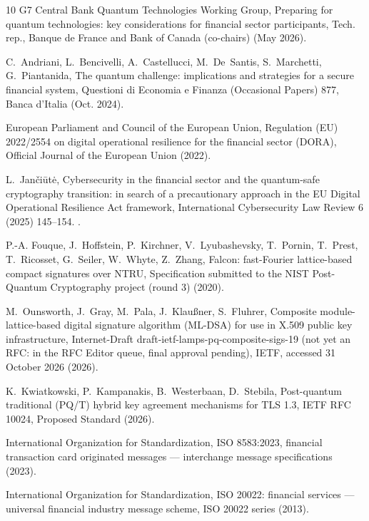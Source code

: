 \documentclass[preprint,12pt]{elsarticle}
\begin{document}
\begin{thebibliography}{10}
{G7 Central Bank Quantum Technologies Working Group}, Preparing for quantum
  technologies: key considerations for financial sector participants, Tech.
  rep., Banque de France and Bank of Canada (co-chairs) (May 2026).

C.~Andriani, L.~Bencivelli, A.~Castellucci, M.~De~Santis, S.~Marchetti,
  G.~Piantanida, The quantum challenge: implications and strategies for a
  secure financial system, Questioni di Economia e Finanza (Occasional Papers)
  877, Banca d'Italia (Oct. 2024).

{European Parliament and Council of the European Union}, Regulation ({EU})
  2022/2554 on digital operational resilience for the financial sector
  ({DORA}), {O}fficial {J}ournal of the {E}uropean {U}nion (2022).

L.~Jan{\v c}i{\=u}t{\.e}, Cybersecurity in the financial sector and the
  quantum-safe cryptography transition: in search of a precautionary approach
  in the {EU} {Digital Operational Resilience Act} framework, International
  Cybersecurity Law Review 6 (2025) 145--154.
\newblock \href {https://doi.org/10.1365/s43439-025-00135-7}
  {}.

P.-A. Fouque, J.~Hoffstein, P.~Kirchner, V.~Lyubashevsky, T.~Pornin, T.~Prest,
  T.~Ricosset, G.~Seiler, W.~Whyte, Z.~Zhang, Falcon: fast-{Fourier}
  lattice-based compact signatures over {NTRU}, Specification submitted to the
  NIST Post-Quantum Cryptography project (round 3) (2020).

M.~Ounsworth, J.~Gray, M.~Pala, J.~Klau{\ss}ner, S.~Fluhrer, Composite
  module-lattice-based digital signature algorithm ({ML-DSA}) for use in
  {X.509} public key infrastructure, Internet-Draft
  draft-ietf-lamps-pq-composite-sigs-19 (not yet an RFC: in the RFC Editor
  queue, final approval pending), {IETF}, accessed 31 October 2026 (2026).

K.~Kwiatkowski, P.~Kampanakis, B.~Westerbaan, D.~Stebila, Post-quantum
  traditional ({PQ/T}) hybrid key agreement mechanisms for {TLS} 1.3, {IETF}
  RFC 10024, Proposed Standard (2026).

{International Organization for Standardization}, {ISO} 8583:2023, financial
  transaction card originated messages --- interchange message specifications
  (2023).

{International Organization for Standardization}, {ISO} 20022: financial
  services --- universal financial industry message scheme, ISO 20022 series
  (2013).


\end{thebibliography}
\end{document}
